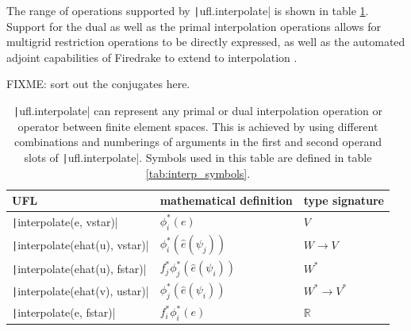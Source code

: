 \documentclass[a4paper,11pt]{article}
\begin{document}
The range of operations supported by \texttt|ufl.interpolate| is shown in table \ref{tab:interpolate}. Support for the dual as well as the primal interpolation operations allows for multigrid restriction operations to be directly expressed, as well as the automated adjoint capabilities of Firedrake \parencite{mitusch2019} to extend to interpolation \parencite{nixon-hill_2024}.

FIXME: sort out the conjugates here.

\begin{table}[htbp]
    \centering
    \begin{tabular}{lll}
        UFL & mathematical definition & type signature \\\hline
         \texttt|interpolate(e, vstar)|&  $\phi^*_i(e)$ & $V$\\
         \texttt|interpolate(ehat(u), vstar)|&  $\phi^*_i(\hat{e}(\psi_j))$ & $W\rightarrow V$\\
        \texttt|interpolate(ehat(u), fstar)|&  $f^*_j\phi^*_j(\hat{e}(\psi_i))$ & $W^*$\\
        \texttt|interpolate(ehat(v), ustar)|&  $\phi^*_j(\hat{e}(\psi_i))$ & $W^*\rightarrow V^*$\\
        \texttt|interpolate(e, fstar)|&  $f^*_i\phi^*_i(e)$ & $\mathbb{R}$\\        
    \end{tabular}
    \caption{\texttt|ufl.interpolate| can represent any primal or dual interpolation operation or operator between finite element spaces. This is achieved by using different combinations and numberings of arguments in the first and second operand slots of \texttt|ufl.interpolate|. Symbols used in this table are defined in table \ref{tab:interp_symbols}.}
    \label{tab:interpolate}
\end{table}
\end{document}
